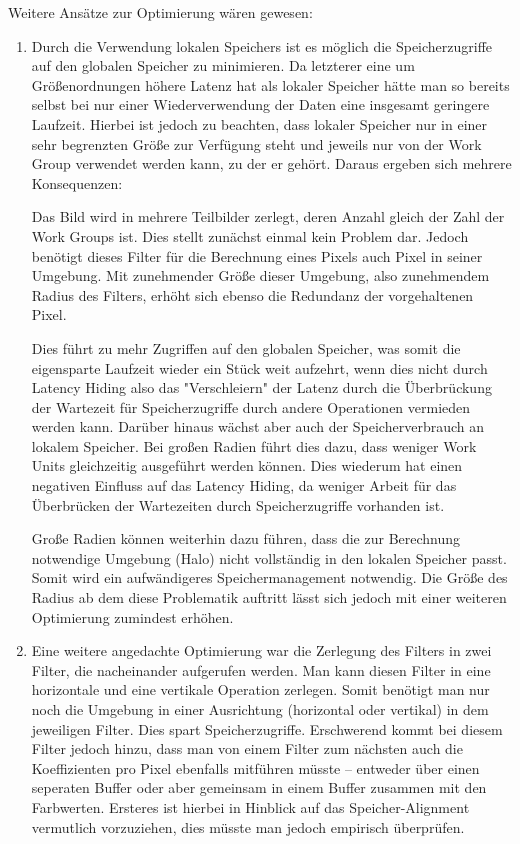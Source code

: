 \documentclass[10pt,a4paper]{article}
\begin{document}
Weitere Ansätze zur Optimierung wären gewesen:
\begin{enumerate}
\item Durch die Verwendung lokalen Speichers ist es möglich die Speicherzugriffe auf den globalen Speicher zu minimieren. Da letzterer eine um Größenordnungen höhere Latenz hat als lokaler Speicher hätte man so bereits selbst bei nur einer Wiederverwendung der Daten eine insgesamt geringere Laufzeit. Hierbei ist jedoch zu beachten, dass lokaler Speicher nur in einer sehr begrenzten Größe zur Verfügung steht und jeweils nur von der Work Group verwendet werden kann, zu der er gehört. Daraus ergeben sich mehrere Konsequenzen:

Das Bild wird in mehrere Teilbilder zerlegt, deren Anzahl gleich der Zahl der Work Groups ist. Dies stellt zunächst einmal kein Problem dar. Jedoch benötigt dieses Filter für die Berechnung eines Pixels auch Pixel in seiner Umgebung. Mit zunehmender Größe dieser Umgebung, also zunehmendem Radius des Filters, erhöht sich ebenso die Redundanz der vorgehaltenen Pixel.




Dies führt zu mehr Zugriffen auf den globalen Speicher, was somit die eigensparte Laufzeit wieder ein Stück weit aufzehrt, wenn dies nicht durch Latency Hiding also das "Verschleiern" der Latenz durch die Überbrückung der Wartezeit für Speicherzugriffe durch andere Operationen vermieden werden kann.
Darüber hinaus wächst aber auch der Speicherverbrauch an lokalem Speicher. Bei großen Radien führt dies dazu, dass weniger Work Units gleichzeitig ausgeführt werden können. Dies wiederum hat einen negativen Einfluss auf das Latency Hiding, da weniger Arbeit für das Überbrücken der Wartezeiten durch Speicherzugriffe vorhanden ist. 



Große Radien können weiterhin dazu führen, dass die zur Berechnung notwendige Umgebung (Halo) nicht vollständig in den lokalen Speicher passt. Somit wird ein aufwändigeres Speichermanagement notwendig. Die Größe des Radius ab dem diese Problematik auftritt lässt sich jedoch mit einer weiteren Optimierung zumindest erhöhen.


\item Eine weitere angedachte Optimierung war die Zerlegung des Filters in zwei Filter, die nacheinander aufgerufen werden. Man kann diesen Filter in eine horizontale und eine vertikale Operation zerlegen. Somit benötigt man nur noch die Umgebung in einer Ausrichtung (horizontal oder vertikal) in dem jeweiligen Filter. Dies spart Speicherzugriffe. Erschwerend kommt bei diesem Filter jedoch hinzu, dass man von einem Filter zum nächsten auch die Koeffizienten pro Pixel ebenfalls mitführen müsste -- entweder über einen seperaten Buffer oder aber gemeinsam in einem Buffer zusammen mit den Farbwerten. Ersteres ist hierbei in Hinblick auf das Speicher-Alignment vermutlich vorzuziehen, dies müsste man jedoch empirisch überprüfen.


\end{enumerate}
\end{document}

